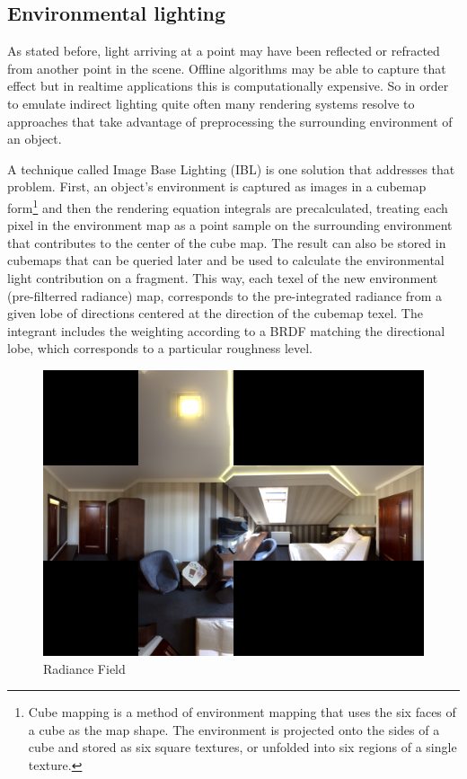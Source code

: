 \subsection{Environmental lighting}
As stated before, light arriving at a point may have been reflected or refracted from another point in the scene.
Offline algorithms may be able to capture that effect but in realtime applications this is computationally expensive.
So in order to emulate indirect lighting quite often many rendering systems resolve to approaches that take advantage of
preprocessing the surrounding environment of an object.

A technique called Image Base Lighting (IBL) is one solution that addresses that problem. First, an object's environment is
captured as images in a cubemap form\footnote{Cube mapping is a method of environment mapping that uses the six faces of a cube
as the map shape. The environment is projected onto the sides of a cube and stored as six square textures, or unfolded into six
regions of a single texture.} and then the rendering equation integrals are precalculated, treating each pixel in the
environment map as a point sample on the surrounding environment that contributes to the center of the cube map. The result
can also be stored in cubemaps that can be queried later and be used to calculate the environmental light contribution on a
fragment. This way, each texel of the new environment (pre-filterred radiance) map, corresponds to the pre-integrated radiance
from a given lobe of directions centered at the direction of the cubemap texel. The integrant includes the weighting according
to a BRDF matching the directional lobe, which corresponds to a particular roughness level.

\begin{figure}[h]
    \centering
    \includegraphics[scale=0.18,clip=true]{./image/envl_ref.png}
    \caption{Radiance Field}
\label{fig:envlref}
\end{figure}

